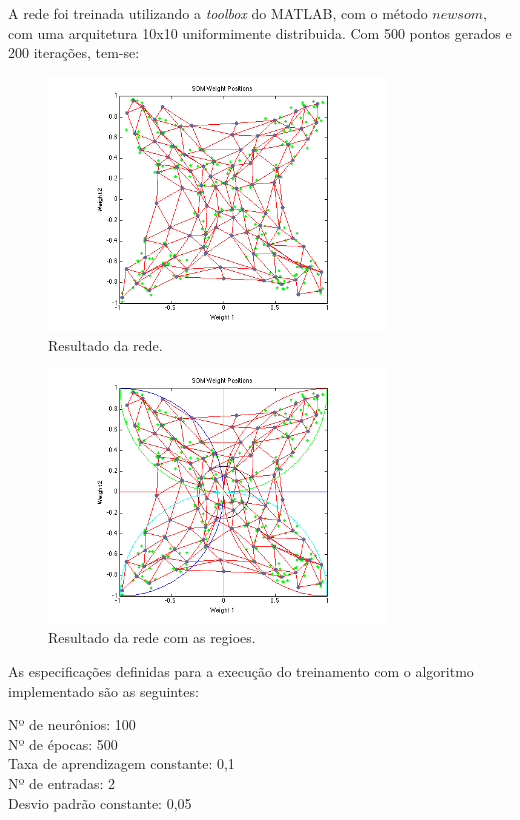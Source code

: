 \documentclass[a4paper,oneside,12pt]{article}
\begin{document}
\begin{enumerate}[1.]
A rede foi treinada utilizando a \emph{toolbox} do MATLAB, com o m\'etodo $newsom$, com uma arquitetura 10x10 uniformimente distribuida. Com 500 pontos gerados e 200 itera\c{c}\~oes, tem-se:

\begin{figure}
\centering
\includegraphics[width=0.8\textwidth]{q8_2.png}
\caption{Resultado da rede.}
\label{fig:q8_2}
\end{figure}

\begin{figure}
\centering
\includegraphics[width=0.8\textwidth]{q8_3.png}
\caption{Resultado da rede com as regioes.}
\label{fig:q8_3}
\end{figure}

As especifica\c{c}\~oes definidas para a execu\c{c}\~ao do treinamento com o algoritmo implementado s\~ao as seguintes: 

Nº de neur\^onios: 100 \\
Nº de \'epocas: 500 \\
Taxa de aprendizagem constante: 0,1 \\
Nº de entradas: 2 \\
Desvio padr\~ao constante: 0,05 \\


\end{enumerate}
\end{document}
